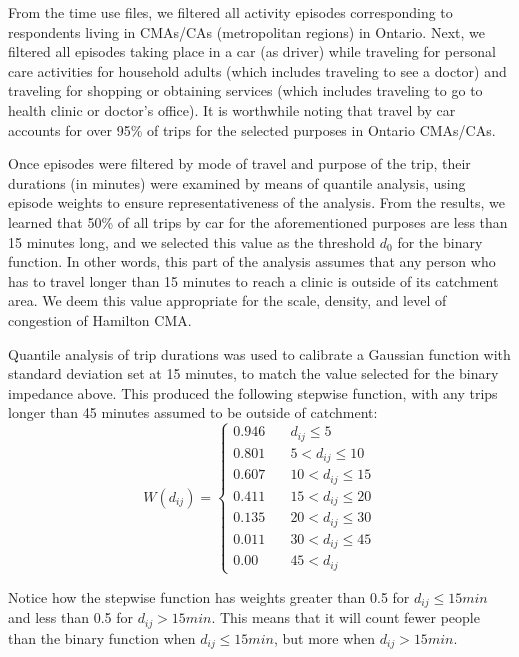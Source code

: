 \documentclass[10pt,letterpaper]{article}
\begin{document}
From the time use files, we filtered all activity episodes corresponding
to respondents living in CMAs/CAs (metropolitan regions) in Ontario.
Next, we filtered all episodes taking place in a car (as driver) while
traveling for personal care activities for household adults (which
includes traveling to see a doctor) and traveling for shopping or
obtaining services (which includes traveling to go to health clinic or
doctor's office). It is worthwhile noting that travel by car accounts
for over 95\% of trips for the selected purposes in Ontario CMAs/CAs.

Once episodes were filtered by mode of travel and purpose of the trip,
their durations (in minutes) were examined by means of quantile
analysis, using episode weights to ensure representativeness of the
analysis. From the results, we learned that 50\% of all trips by car for
the aforementioned purposes are less than 15 minutes long, and we
selected this value as the threshold \(d_0\) for the binary function. In
other words, this part of the analysis assumes that any person who has
to travel longer than 15 minutes to reach a clinic is outside of its
catchment area. We deem this value appropriate for the scale, density,
and level of congestion of Hamilton CMA.

Quantile analysis of trip durations was used to calibrate a Gaussian
function with standard deviation set at 15 minutes, to match the value
selected for the binary impedance above. This produced the following
stepwise function, with any trips longer than 45 minutes assumed to be
outside of catchment: \[
W(d_{ij}) = \left\{
        \begin{array}{ll}
            0.946 & \quad d_{ij} \leq 5 \\
            0.801 & \quad 5 < d_{ij} \leq 10 \\
            0.607 & \quad 10 < d_{ij} \leq 15 \\
            0.411 & \quad 15 < d_{ij} \leq 20 \\
            0.135 & \quad 20 < d_{ij} \leq 30 \\
            0.011 & \quad 30 < d_{ij} \leq 45 \\
            0.00 & \quad 45 < d_{ij}
        \end{array}
    \right.
\]

Notice how the stepwise function has weights greater than 0.5 for
\(d_{ij} \leq 15 min\) and less than 0.5 for \(d_{ij} > 15 min\). This
means that it will count fewer people than the binary function when
\(d_{ij} \leq 15 min\), but more when \(d_{ij} > 15 min\).
\end{document}
